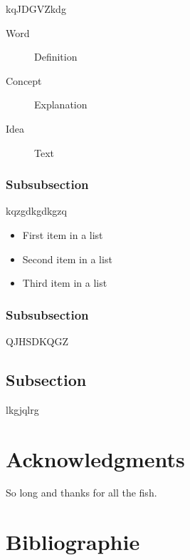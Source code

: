 \documentclass[fleqn,10pt]{SelfArx} %
\begin{document}
kqJDGVZkdg

\begin{description}
	\item[Word] Definition
	\item[Concept] Explanation
	\item[Idea] Text
\end{description}

\subsubsection{Subsubsection}

kqzgdkgdkgzq

\begin{itemize}[noitemsep] %
	\item First item in a list
	\item Second item in a list
	\item Third item in a list
\end{itemize}

\subsubsection{Subsubsection}

QJHSDKQGZ

\subsection{Subsection}

lkgjqlrg

\section*{Acknowledgments} %


So long and thanks for all the fish. \cite{OC_obj}


\section*{Bibliographie}




\end{document}
